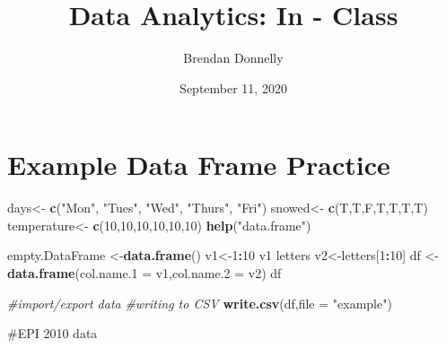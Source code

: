 \documentclass[
]{article}
\title{Data Analytics: In - Class}
\author{Brendan Donnelly}
\date{September 11, 2020}
\newenvironment{Shaded}{\begin{snugshade}}{\end{snugshade}}
\newcommand{\CommentTok}[1]{\textcolor[rgb]{0.56,0.35,0.01}{\textit{#1}}}
\newcommand{\DataTypeTok}[1]{\textcolor[rgb]{0.13,0.29,0.53}{#1}}
\newcommand{\DecValTok}[1]{\textcolor[rgb]{0.00,0.00,0.81}{#1}}
\newcommand{\KeywordTok}[1]{\textcolor[rgb]{0.13,0.29,0.53}{\textbf{#1}}}
\newcommand{\NormalTok}[1]{#1}
\newcommand{\OperatorTok}[1]{\textcolor[rgb]{0.81,0.36,0.00}{\textbf{#1}}}
\newcommand{\StringTok}[1]{\textcolor[rgb]{0.31,0.60,0.02}{#1}}
\begin{document}
\maketitle

\hypertarget{example-data-frame-practice}{%
\section{Example Data Frame
Practice}\label{example-data-frame-practice}}

\begin{Shaded}
\begin{Highlighting}[]
\NormalTok{days<-}\StringTok{ }\KeywordTok{c}\NormalTok{(}\StringTok{"Mon"}\NormalTok{, }\StringTok{"Tues"}\NormalTok{, }\StringTok{"Wed"}\NormalTok{, }\StringTok{"Thurs"}\NormalTok{, }\StringTok{"Fri"}\NormalTok{)}
\NormalTok{snowed<-}\StringTok{ }\KeywordTok{c}\NormalTok{(T,T,F,T,T,T,T)}
\NormalTok{temperature<-}\StringTok{ }\KeywordTok{c}\NormalTok{(}\DecValTok{10}\NormalTok{,}\DecValTok{10}\NormalTok{,}\DecValTok{10}\NormalTok{,}\DecValTok{10}\NormalTok{,}\DecValTok{10}\NormalTok{,}\DecValTok{10}\NormalTok{)}
\KeywordTok{help}\NormalTok{(}\StringTok{"data.frame"}\NormalTok{)}


\NormalTok{empty.DataFrame <-}\KeywordTok{data.frame}\NormalTok{()}
\NormalTok{v1<-}\DecValTok{1}\OperatorTok{:}\DecValTok{10}
\NormalTok{v1}
\NormalTok{letters}
\NormalTok{v2<-letters[}\DecValTok{1}\OperatorTok{:}\DecValTok{10}\NormalTok{]}
\NormalTok{df <-}\StringTok{ }\KeywordTok{data.frame}\NormalTok{(}\DataTypeTok{col.name.1 =}\NormalTok{ v1,}\DataTypeTok{col.name.2 =}\NormalTok{ v2)}
\NormalTok{df}

\CommentTok{#import/export data}
\CommentTok{#writing to CSV}
\KeywordTok{write.csv}\NormalTok{(df,}\DataTypeTok{file =} \StringTok{"example"}\NormalTok{)}
\end{Highlighting}
\end{Shaded}

\#EPI 2010 data

\begin{Shaded}
\end{Shaded}
\end{document}
